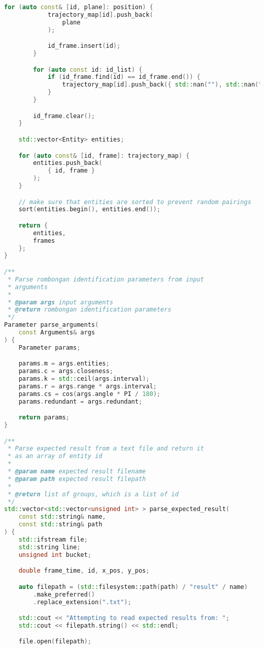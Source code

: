 \begin{lstlisting}[language=C++, caption=Implementasi 
modul \texttt{parser.cpp},label={lamp:module-parser}]
        for (auto const& [id, plane]: position) {
            trajectory_map[id].push_back(
                plane  
            );

            id_frame.insert(id);
        }

        for (auto const id: id_list) {
            if (id_frame.find(id) == id_frame.end()) {
                trajectory_map[id].push_back({ std::nan(""), std::nan("") });
            }
        }

        id_frame.clear();
    }

    std::vector<Entity> entities;

    for (auto const& [id, frame]: trajectory_map) {
        entities.push_back(
            { id, frame }
        );
    }

    // make sure that entities are sorted to prevent random pairings
    sort(entities.begin(), entities.end());

    return {
        entities,
        frames
    };
}

/**
 * Parse rombongan identification parameters from input
 * arguments
 * 
 * @param args input arguments
 * @return rombongan identification parameters
 */
Parameter parse_arguments(
    const Arguments& args
) {
    Parameter params;

    params.m = args.entities;
    params.c = args.closeness;
    params.k = std::ceil(args.interval);
    params.r = args.range * args.interval;
    params.cs = cos(args.angle * PI / 180);
    params.redundant = args.redundant;

    return params;
}

/**
 * Parse expected result from a text file and return it
 * as an array of entity id
 * 
 * @param name expected result filename
 * @param path expected result filepath
 * 
 * @return list of groups, which is a list of id
 */
std::vector<std::vector<unsigned int> > parse_expected_result(
    const std::string& name,
    const std::string& path
) {
    std::ifstream file;
    std::string line;
    unsigned int bucket;

    double frame_time, id, x_pos, y_pos;

    auto filepath = (std::filesystem::path(path) / "result" / name)
        .make_preferred()
        .replace_extension(".txt");

    std::cout << "Attempting to read expected results from: ";
    std::cout << filepath.string() << std::endl; 

    file.open(filepath);


\end{lstlisting}
